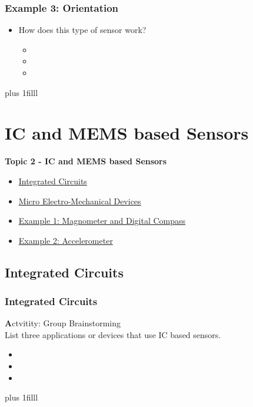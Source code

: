 \documentclass[fleqn]{beamer} %
\newcommand{\sectionIItitle}{IC and MEMS based Sensors}
\newcommand{\sectionIsubsectionIVtitle}{Example 3: Orientation}
\newcommand{\sectionIIsubsectionItitle}{Integrated Circuits}
\newcommand{\sectionIIsubsectionIItitle}{Micro Electro-Mechanical Devices}
\newcommand{\sectionIIsubsectionIIItitle}{Example 1: Magnometer and Digital Compass}
\newcommand{\sectionIIsubsectionIVtitle}{Example 2: Accelerometer}
\newcommand{\btVFill}{\vskip0pt plus 1filll}
\begin{document}
			\begin{frame}
				\frametitle{\sectionIsubsectionIVtitle}
				\begin{itemize}
					\item How does this type of sensor work?
					\begin{itemize}
						\item \vspace{5mm}
						\item \vspace{5mm}
						\item \vspace{5mm}	
					\end{itemize}
				\end{itemize}
				
				\btVFill

			\end{frame}

	
	\section{\sectionIItitle}\label{sectionII}

		\begin{frame}
			\large \textbf{Topic 2 - \sectionIItitle} \vspace{3mm}\\

			\begin{itemize}
				\item \hyperlink{sectionIIsubsectionI}{\sectionIIsubsectionItitle} \vspc %
				\item \hyperlink{sectionIIsubsectionII}{\sectionIIsubsectionIItitle} \vspc %
				\item \hyperlink{sectionIIsubsectionIII}{\sectionIIsubsectionIIItitle} \vspc %
				\item \hyperlink{sectionIIsubsectionIV}{\sectionIIsubsectionIVtitle} \vspc %
			\end{itemize}

		\end{frame}

		\subsection{\sectionIIsubsectionItitle}\label{sectionIIsubsectionI}

			\begin{frame}[label=sectionIIsubsectionI]
				\frametitle{\sectionIIsubsectionItitle}

				{\textbf Actvitity:} Group Brainstorming \\
				List three applications or devices that use IC based sensors.
				\begin{itemize}
					\item
					\item
					\item
				\end{itemize}
				\btVFill	


			\end{frame}
\end{document}
